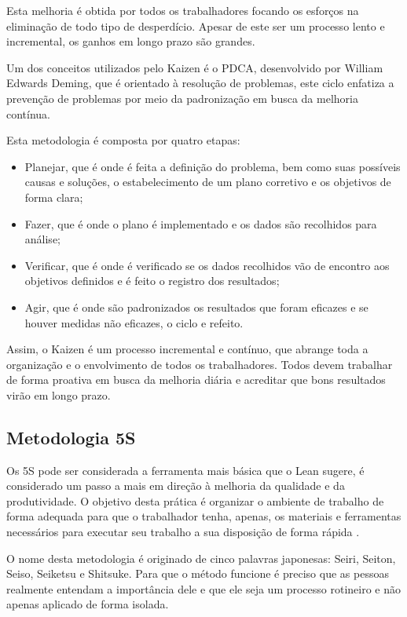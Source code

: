 \begin{anexosenv}
Esta melhoria é obtida por todos os trabalhadores focando os esforços na eliminação de todo tipo de desperdício. Apesar de este ser um processo lento e incremental, os ganhos em longo prazo são grandes.

Um dos conceitos utilizados pelo Kaizen é o PDCA, desenvolvido por William Edwards Deming, que é orientado à resolução de problemas, este ciclo enfatiza a prevenção de problemas por meio da padronização em busca da melhoria contínua. 

Esta metodologia é composta por quatro etapas:
\begin{itemize}
\item Planejar, que é onde é feita a definição do problema, bem como suas possíveis causas e soluções, o estabelecimento de um plano corretivo e os objetivos de forma clara;
\item Fazer, que é onde o plano é implementado e os dados são recolhidos para análise;
\item Verificar, que é onde é verificado se os dados recolhidos vão de encontro aos objetivos definidos e é feito o registro dos resultados;
\item Agir, que é onde são padronizados os resultados que foram eficazes e se houver medidas não eficazes, o ciclo e refeito.
\end{itemize}

Assim, o Kaizen é um processo incremental e contínuo, que abrange toda a organização e o envolvimento de todos os trabalhadores. Todos devem trabalhar de forma proativa em busca da melhoria diária e acreditar que bons resultados virão em longo prazo.

\subsection[Metodologia 5S]{Metodologia 5S}

Os 5S pode ser considerada a ferramenta mais básica que o Lean sugere, é considerado um passo a mais em direção à melhoria da qualidade e da produtividade. O objetivo desta prática é organizar o ambiente de trabalho de forma adequada para que o trabalhador tenha, apenas, os materiais e ferramentas necessários para executar seu trabalho a sua disposição de forma rápida \cite{bell2011}. 

O nome desta metodologia é originado de cinco palavras japonesas: Seiri, Seiton, Seiso, Seiketsu e Shitsuke. Para que o método funcione é preciso que as pessoas realmente entendam a importância dele e que ele seja um processo rotineiro e não apenas aplicado de forma isolada.


\end{anexosenv}
